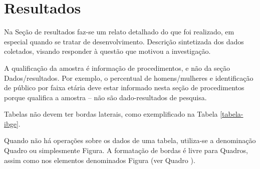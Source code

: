 \chapter{Resultados}
\label{chap:resultados}

Na Seção de resultados faz-se um relato detalhado do que foi realizado, em especial quando se tratar de desenvolvimento. Descrição sintetizada dos dados coletados, visando responder à questão que motivou a investigação. 

A qualificação da amostra é informação de procedimentos, e não da seção Dados/resultados. Por exemplo, o percentual de homens/mulheres e identificação de público por faixa etária deve estar informado nesta seção de procedimentos porque qualifica a amostra – não são dado-resultados de pesquisa.

Tabelas não devem ter bordas laterais, como exemplificado na Tabela \ref{tabela-ibge}.

\begin{table}[h!]
\end{table}

Quando não há operações sobre os dados de uma tabela, utiliza-se a denominação Quadro ou simplesmente Figura. A formatação de bordas é livre para Quadros, assim como nos elementos denominados Figura (ver Quadro \label{qua:exemplo-1}).

